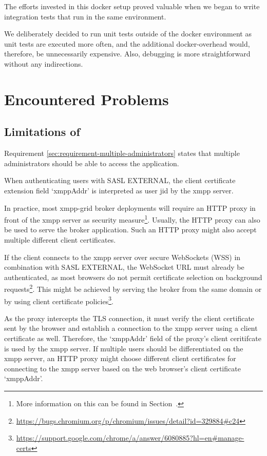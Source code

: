 The efforts invested in this docker setup proved valuable when we began to write integration tests that run in the same environment.

We deliberately decided to run unit tests outside of the docker environment as unit tests are executed more often, and the additional docker-overhead would, therefore, be unnecessarily expensive.
Also, debugging is more straightforward without any indirections.

\section{Encountered Problems}\label{encountered-problems}

\subsection{Limitations of \emph{}}\label{sec:limitations-of-requirement-multiple-administrators}

Requirement \ref{sec:requirement-multiple-administrators} states that multiple administrators should be able to access the application.

When authenticating users with SASL EXTERNAL, the client certificate extension field `xmppAddr' is interpreted as user \gls{jid} by the \gls{xmpp} server.

In practice, most \gls{xmpp-grid} \gls{broker} deployments will require an HTTP proxy in front of the \gls{xmpp} server as security measure\footnote{
More information on this can be found in Section~.}.
Usually, the HTTP proxy can also be used to serve the \gls{broker} application.
Such an HTTP proxy might also accept multiple different client certificates.

If the client connects to the \gls{xmpp} server over secure WebSockets (WSS) in combination with SASL EXTERNAL, the WebSocket URL must already be authenticated, as most browsers do not permit certificate selection on background requests\footnote{\url{https://bugs.chromium.org/p/chromium/issues/detail?id=329884\#c24}}.
This might be achieved by serving the \gls{broker} from the same domain or by using client certificate policies\footnote{\url{https://support.google.com/chrome/a/answer/6080885?hl=en\#manage-certs}}.

As the proxy intercepts the TLS connection, it must verify the client certificate sent by the browser and establish a connection to the \gls{xmpp} server using a client certificate as well.
Therefore, the `xmppAddr' field of the proxy's client ceritifcate is used by the \gls{xmpp} server.
If multiple users should be differentiated on the \gls{xmpp} server, an HTTP proxy might choose different client certificates for connecting to the \gls{xmpp} server based on the web browser's client certificate `xmppAddr'.


